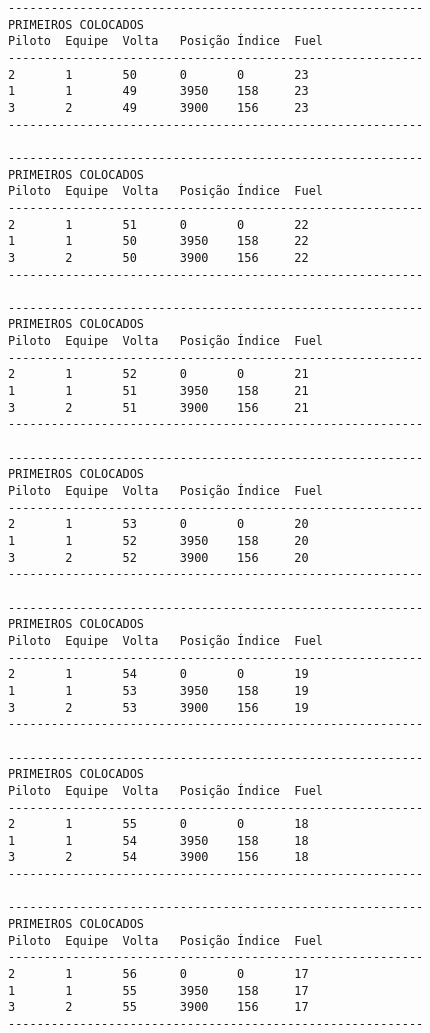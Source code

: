 \documentclass[12pt]{article}
\begin{document}
\begin{verbatim}
----------------------------------------------------------
PRIMEIROS COLOCADOS
Piloto  Equipe  Volta   Posição Índice  Fuel
----------------------------------------------------------
2       1       50      0       0       23
1       1       49      3950    158     23
3       2       49      3900    156     23
----------------------------------------------------------

----------------------------------------------------------
PRIMEIROS COLOCADOS
Piloto  Equipe  Volta   Posição Índice  Fuel
----------------------------------------------------------
2       1       51      0       0       22
1       1       50      3950    158     22
3       2       50      3900    156     22
----------------------------------------------------------

----------------------------------------------------------
PRIMEIROS COLOCADOS
Piloto  Equipe  Volta   Posição Índice  Fuel
----------------------------------------------------------
2       1       52      0       0       21
1       1       51      3950    158     21
3       2       51      3900    156     21
----------------------------------------------------------

----------------------------------------------------------
PRIMEIROS COLOCADOS
Piloto  Equipe  Volta   Posição Índice  Fuel
----------------------------------------------------------
2       1       53      0       0       20
1       1       52      3950    158     20
3       2       52      3900    156     20
----------------------------------------------------------

----------------------------------------------------------
PRIMEIROS COLOCADOS
Piloto  Equipe  Volta   Posição Índice  Fuel
----------------------------------------------------------
2       1       54      0       0       19
1       1       53      3950    158     19
3       2       53      3900    156     19
----------------------------------------------------------

----------------------------------------------------------
PRIMEIROS COLOCADOS
Piloto  Equipe  Volta   Posição Índice  Fuel
----------------------------------------------------------
2       1       55      0       0       18
1       1       54      3950    158     18
3       2       54      3900    156     18
----------------------------------------------------------

----------------------------------------------------------
PRIMEIROS COLOCADOS
Piloto  Equipe  Volta   Posição Índice  Fuel
----------------------------------------------------------
2       1       56      0       0       17
1       1       55      3950    158     17
3       2       55      3900    156     17
----------------------------------------------------------


\end{verbatim}
\end{document}
